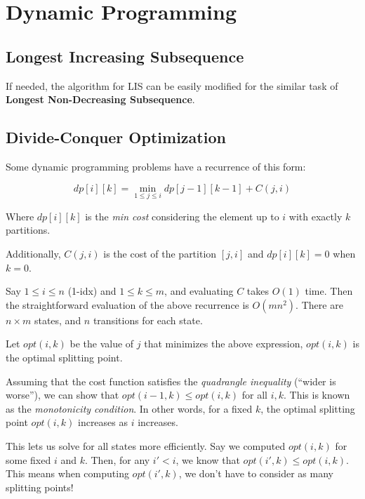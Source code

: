\chapter{Dynamic Programming}

\section{Longest Increasing Subsequence}

    If needed, the algorithm for LIS can be easily modified for 
    the similar task of \textbf{Longest Non-Decreasing Subsequence}.


\section{Divide-Conquer Optimization}

        Some dynamic programming problems have a recurrence of this form:

        $$ dp[i][k] = \min_{1 \leq j \leq i} dp[j - 1][k - 1] + C(j, i) $$

        Where $dp[i][k] $ is the \textit{min cost} considering the element up to $i$ with exactly $k$ partitions.

        Additionally, $C(j, i)$ is the cost of the partition $[j, i]$ and $dp[i][k] = 0$ when $k = 0$.

        Say $ 1 \leq i \leq n $ (1-idx) and $1 \leq k \leq m$, and evaluating $C$ takes $O(1)$ time. 
        Then the straightforward evaluation of the above recurrence is $O(m n^2)$. There are
        $n \times m$ states, and $n$ transitions for each state.

        Let $opt(i, k)$ be the value of $j$ that minimizes the above expression, $opt(i, k)$ is the optimal splitting point.

        Assuming that the cost function satisfies the \textit{quadrangle inequality} (``wider is worse''), we can show that
        $opt(i-1, k) \leq opt(i, k)$ for all ${i, k}$. This is known as the \textit{monotonicity condition}. In other words,
        for a fixed $k$, the optimal splitting point $opt(i, k)$ increases as $i$ increases.

        This lets us solve for all states more efficiently. Say we computed $opt(i, k)$ for some fixed $i$ and $k$. 
        Then, for any $i' < i$, we know that $opt(i', k) \leq opt(i, k)$. 
        This means when computing $opt(i', k)$, we don't have to consider as many splitting points!

